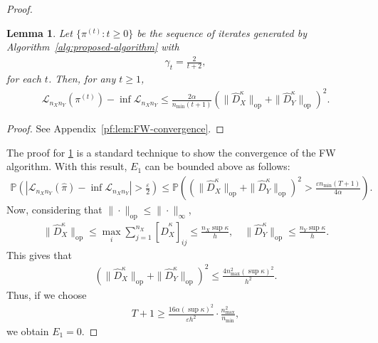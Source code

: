 \documentclass{article}
\newtheorem{lemma}{Lemma}
\begin{document}
\begin{proof}
	\begin{lemma}
		\label{lem:FW-convergence}
		Let $\{\pi^{(t)}: t \geq 0\}$ be the sequence of iterates generated by Algorithm~\ref{alg:proposed-algorithm} with
		\begin{align*}
			\gamma_t = \frac{2}{t+2} ,
		\end{align*}
		for each $t$. Then, for any $t \geq 1$,
		\begin{align*}
			\mathcal{L}_{n_Xn_Y}(\pi^{(t)}) - \inf\mathcal{L}_{n_Xn_Y} \leq \frac{2\alpha}{n_{\min}(t+1)} \left(\|\hat{D}_X^\kappa\|_{\mathrm{op}} + \|\hat{D}_Y^\kappa\|_{\mathrm{op}}\right)^2 .
		\end{align*}
	\end{lemma}
	\begin{proof}
		See Appendix~\ref{pf:lem:FW-convergence}.
	\end{proof}
	
	The proof for \cref{lem:FW-convergence} is a standard technique to show the convergence of the FW algorithm. With this result, $E_1$ can be bounded above as follows:
	\begin{align*}
		\mathbb{P}\left(\left\vert \mathcal{L}_{n_Xn_Y}(\hat{\pi}) - \inf \mathcal{L}_{n_Xn_Y} \right\vert > \frac{\varepsilon}{2}\right) \leq \mathbb{P}\left(\left(\|\hat{D}_X^\kappa\|_{\mathrm{op}} + \|\hat{D}_Y^\kappa\|_{\mathrm{op}}\right)^2 > \frac{\varepsilon n_{\min}(T+1)}{4\alpha}\right) .
	\end{align*}
	Now, considering that $\|\cdot\|_{\mathrm{op}} \leq \|\cdot\|_{\infty}$,
	\begin{align*}
		\|\hat{D}_X^\kappa\|_{\mathrm{op}} \leq \max_{i} \sum_{j=1}^{n_X} [\hat{D}_X^\kappa]_{ij} \leq \frac{n_X\sup\kappa}{h} , \quad \|\hat{D}_Y^\kappa\|_{\mathrm{op}} \leq \frac{n_Y\sup\kappa}{h} .
	\end{align*}
	This gives that
	\begin{align*}
		\left(\|\hat{D}_X^\kappa\|_{\mathrm{op}} + \|\hat{D}_Y^\kappa\|_{\mathrm{op}}\right)^2 \leq \frac{4n_{\max}^2(\sup\kappa)^2}{h^2} .
	\end{align*}
	Thus, if we choose
	\begin{align*}
		T + 1 \geq \frac{16\alpha(\sup\kappa)^2}{\varepsilon h^2} \cdot \frac{n_{\max}^2}{n_{\min}} ,
	\end{align*}
	we obtain $E_1 = 0$.
	

\end{proof}
\end{document}
